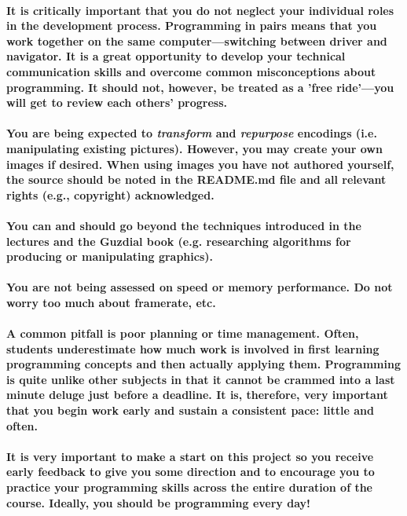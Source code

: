 \documentclass{../../fal_assignment}
\begin{document}
\paragraph{It is critically important that you do not neglect your individual roles in the development process. Programming in pairs means that you work together on the same computer---switching between driver and navigator. It is a great opportunity to develop your technical communication skills and overcome common misconceptions about programming. It should not, however, be treated as a 'free ride'---you will get to review each others' progress.}

\paragraph{You are being expected to \textit{transform} and \textit{repurpose} encodings (i.e. manipulating existing pictures). However, you may create your own images if desired. When using images you have not authored yourself, the source should be noted in the README.md file and all relevant rights (e.g., copyright) acknowledged. }

\paragraph{You can and should go beyond the techniques introduced in the lectures and the Guzdial book (e.g. researching algorithms for producing or manipulating graphics).}

\paragraph{You are not being assessed on speed or memory performance. Do not worry too much about framerate, etc.}

\paragraph{A common pitfall is poor planning or time management. Often, students underestimate how much work is involved in first learning programming concepts and then actually applying them. Programming is quite unlike other subjects in that it cannot be crammed into a last minute deluge just before a deadline. It is, therefore, very important that you begin work early and sustain a consistent pace: little and often.}

\paragraph{It is very important to make a start on this project so you receive early feedback to give you some direction and to encourage you to practice your programming skills across the entire duration of the course. Ideally, you should be programming every day!}
\end{document}
